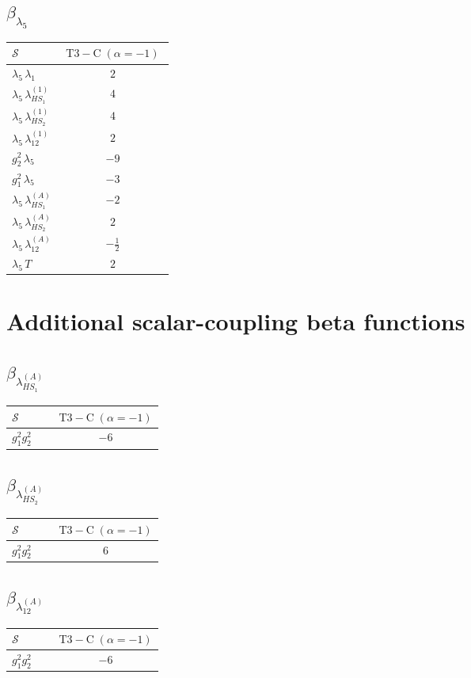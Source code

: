 \documentclass[9pt]{article}
\begin{document}
\subsection*{$ \beta_{\lambda_5} $}
\begin{longtable}{@{}p{0.31\linewidth}c@{}}
\toprule
$\mathcal{S}$ & $ \mathrm{T3-C}\;(\alpha=-1) $ \\
\midrule
$ \lambda_5\,\lambda_1 $ & $ 2 $ \\
$ \lambda_5\,\lambda_{HS_1}^{(1)} $ & $ 4 $ \\
$ \lambda_5\,\lambda_{HS_2}^{(1)} $ & $ 4 $ \\
$ \lambda_5\,\lambda_{12}^{(1)} $ & $ 2 $ \\
$ g_2^2\,\lambda_5 $ & $ -9 $ \\
$ g_1^2\,\lambda_5 $ & $ -3 $ \\
$ \lambda_5\,\lambda_{HS_1}^{(A)} $ & $ -2 $ \\
$ \lambda_5\,\lambda_{HS_2}^{(A)} $ & $ 2 $ \\
$ \lambda_5\,\lambda_{12}^{(A)} $ & $ - \frac{1}{2} $ \\
$ \lambda_5\,T $ & $ 2 $ \\
\bottomrule
\end{longtable}
\section*{Additional scalar-coupling beta functions}
\subsection*{$ \beta_{\lambda_{HS_1}^{(A)}} $}
\begin{longtable}{@{}p{0.31\linewidth}c@{}}
\toprule
$\mathcal{S}$ & $ \mathrm{T3-C}\;(\alpha=-1) $ \\
\midrule
$ g_1^2g_2^2 $ & $ -6 $ \\
\bottomrule
\end{longtable}
\subsection*{$ \beta_{\lambda_{HS_2}^{(A)}} $}
\begin{longtable}{@{}p{0.31\linewidth}c@{}}
\toprule
$\mathcal{S}$ & $ \mathrm{T3-C}\;(\alpha=-1) $ \\
\midrule
$ g_1^2g_2^2 $ & $ 6 $ \\
\bottomrule
\end{longtable}
\subsection*{$ \beta_{\lambda_{12}^{(A)}} $}
\begin{longtable}{@{}p{0.31\linewidth}c@{}}
\toprule
$\mathcal{S}$ & $ \mathrm{T3-C}\;(\alpha=-1) $ \\
\midrule
$ g_1^2g_2^2 $ & $ -6 $ \\
\bottomrule
\end{longtable}
\end{document}
